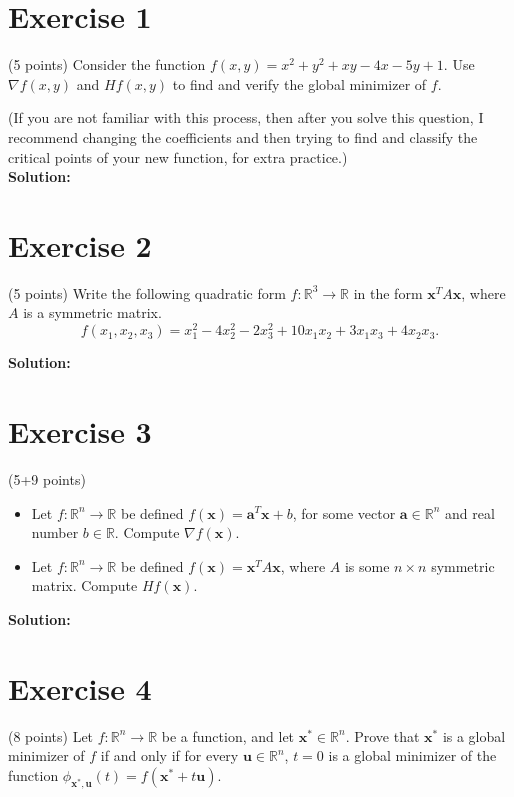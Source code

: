 \documentclass{article}
\begin{document}
\section*{Exercise 1}
(5 points) Consider the function $f(x,y) = x^2 + y^2 + xy - 4x - 5y + 1$. Use $\nabla f(x,y)$ and $Hf(x,y)$ to find and verify the global minimizer of $f$.

(If you are not familiar with this process, then after you solve this question, I recommend changing the coefficients and then trying to find and classify the critical points of your new function, for extra practice.)\\

\textbf{Solution:}

\newpage

\section*{Exercise 2}
(5 points) Write the following quadratic form $f: \mathbb{R}^3 \to \mathbb{R}$ in the form $\mathbf{x}^T A\mathbf{x}$, where $A$ is a symmetric matrix.
$$f(x_1,x_2,x_3) = x_1^2 - 4x_2^2 - 2x_3^2 + 10x_1x_2 + 3x_1x_3 + 4x_2x_3.$$

\textbf{Solution:}

\newpage

\section*{Exercise 3}
(5+9 points)
\begin{itemize}
    \item Let $f: \mathbb{R}^n \to \mathbb{R}$ be defined $f(\mathbf{x}) = \mathbf{a}^T\mathbf{x} + b$, for some vector $\mathbf{a} \in \mathbb{R}^n$ and real number $b \in \mathbb{R}$. Compute $\nabla f(\mathbf{x})$.
    \item Let $f: \mathbb{R}^n \to \mathbb{R}$ be defined $f(\mathbf{x}) = \mathbf{x}^T A\mathbf{x}$, where $A$ is some $n \times n$ symmetric matrix. Compute $Hf(\mathbf{x})$.
\end{itemize}

\textbf{Solution:}

\newpage

\section*{Exercise 4}
(8 points) Let $f: \mathbb{R}^n \to \mathbb{R}$ be a function, and let $\mathbf{x}^* \in \mathbb{R}^n$. Prove that $\mathbf{x}^*$ is a global minimizer of $f$ if and only if for every $\mathbf{u} \in \mathbb{R}^n$, $t = 0$ is a global minimizer of the function $\phi_{\mathbf{x}^*,\mathbf{u}}(t) = f(\mathbf{x}^* + t\mathbf{u})$.
\end{document}
